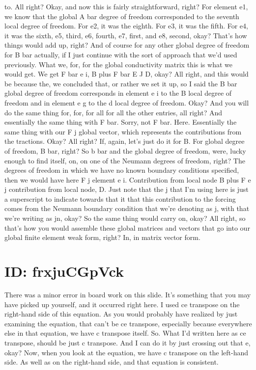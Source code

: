 \documentclass[10pt]{article}
\begin{document}
to. All right? Okay, and now this is fairly straightforward, right? For element e1, we know that the global A bar degree of freedom corresponded to the seventh local degree of freedom. For e2, it was the eighth. For e3, it was the fifth. For e4, it was the sixth, e5, third, e6, fourth, e7, first, and e8, second, okay? That's how things would add up, right? And of course for any other global degree of freedom for B bar actually, if I just continue with the sort of approach that we'd used previously. What we, for, for the global conductivity matrix this is what we would get. We get F bar e i, B plus F bar E J D, okay? All right, and this would be because the, we concluded that, or rather we set it up, so I said the B bar global degree of freedom corresponds in element e i to the B local degree of freedom and in element e g to the d local degree of freedom. Okay? And you will do the same thing for, for, for all for all the other entries, all right? And essentially the same thing with F bar. Sorry, not F bar. Here. Essentially the same thing with our F j global vector, which represents the contributions from the tractions. Okay? All right? If, again, let's just do it for B. For global degree of freedom, B bar, right? So b bar and the global degree of freedom, were, lucky enough to find itself, on, on one of the Neumann degrees of freedom, right? The degrees of freedom in which we have no known boundary conditions specified, then we would have here F j element e i. Contribution from local node B plus F e j contribution from local node, D. Just note that the j that I'm using here is just a superscript to indicate towards that it that this contribution to the forcing comes from the Neumann boundary condition that we're denoting as j, with that we're writing as jn, okay? So the same thing would carry on, okay? All right, so that's how you would assemble these global matrices and vectors that go into our global finite element weak form, right? In, in matrix vector form.

\section*{ID: frxjuCGpVck}
There was a minor error in board work on this slide. It's something that you may have picked up yourself, and it occurred right here. I used ce transpose on the right-hand side of this equation. As you would probably have realized by just examining the equation, that can't be ce transpose, especially because everywhere else in that equation, we have c transpose itself. So. What I'd written here as ce transpose, should be just c transpose. And I can do it by just crossing out that e, okay? Now, when you look at the equation, we have c transpose on the left-hand side. As well as on the right-hand side, and that equation is consistent.
\end{document}
